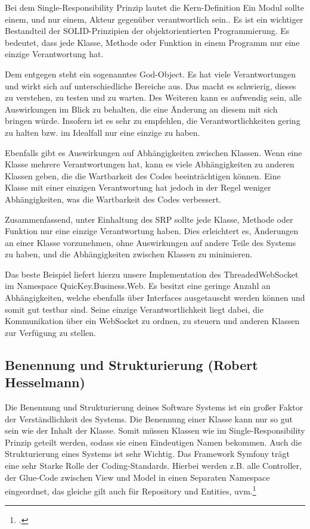 Bei dem Single-Responsibility Prinzip lautet die Kern-Definition \glqq Ein Modul sollte einem, und nur einem, Akteur gegenüber verantwortlich sein.\grqq{}. Es ist ein wichtiger Bestandteil der SOLID-Prinzipien der objektorientierten Programmierung. Es bedeutet, dass jede Klasse, Methode oder Funktion in einem Programm nur eine einzige Verantwortung hat.

Dem entgegen steht ein sogenanntes God-Object. Es hat viele Verantwortungen und wirkt sich auf unterschiedliche Bereiche aus.
Das macht es schwierig, dieses zu verstehen, zu testen und zu warten. Des Weiteren kann es aufwendig sein, alle Auswirkungen im Blick zu behalten, die eine Änderung an diesem mit sich bringen würde. Insofern ist es sehr zu empfehlen, die Verantwortlichkeiten gering zu halten bzw. im Idealfall nur eine einzige zu haben.

Ebenfalls gibt es Auswirkungen auf Abhängigkeiten zwischen Klassen. Wenn eine Klasse mehrere Verantwortungen hat, kann es viele Abhängigkeiten zu anderen Klassen geben, die die Wartbarkeit des Codes beeinträchtigen können. Eine Klasse mit einer einzigen Verantwortung hat jedoch in der Regel weniger Abhängigkeiten, was die Wartbarkeit des Codes verbessert.

Zusammenfassend, unter Einhaltung des SRP sollte jede Klasse, Methode oder Funktion nur eine einzige Verantwortung haben. Dies erleichtert es, Änderungen an einer Klasse vorzunehmen, ohne Auswirkungen auf andere Teile des Systems zu haben, und die Abhängigkeiten zwischen Klassen zu minimieren.

Das beste Beispiel liefert hierzu unsere Implementation des ThreadedWebSocket im Namespace QuicKey.Business.Web. Es besitzt eine geringe Anzahl an Abhängigkeiten, welche ebenfalls über Interfaces ausgetauscht werden können und somit gut testbar sind. Seine einzige Verantwortlichkeit liegt dabei, die Kommunikation über ein WebSocket zu ordnen, zu steuern und anderen Klassen zur Verfügung zu stellen.

\subsection*{Benennung und Strukturierung (Robert Hesselmann)}

Die Benennung und Strukturierung deines Software Systems ist ein großer Faktor der Verständlichkeit des Systems. Die Benennung einer Klasse kann nur so gut sein wie der Inhalt der Klasse. Somit müssen Klassen wie im Single-Responsibility Prinzip geteilt werden, sodass sie einen Eindeutigen Namen bekommen. Auch die Strukturierung eines Systems ist sehr Wichtig. Das Framework Symfony trägt eine sehr Starke Rolle der Coding-Standards. Hierbei werden z.B. alle Controller, der Glue-Code zwischen View und Model in einen Separaten Namespace eingeordnet, das gleiche gilt auch für Repository und Entities, uvm.\footcite[.vgl]{Symfony2005}



